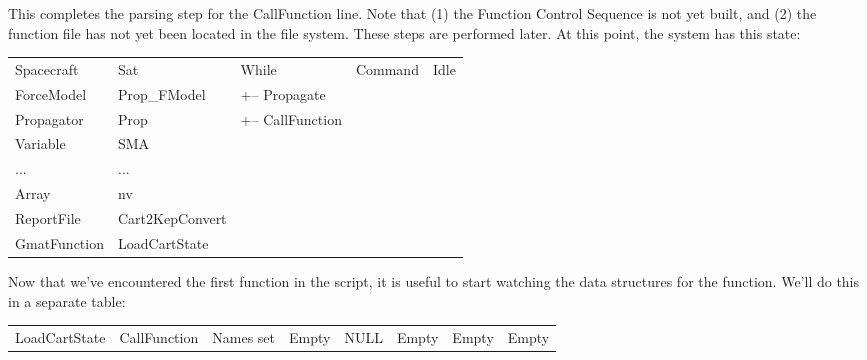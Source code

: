This completes the parsing step for the CallFunction line.  Note that (1) the Function Control
Sequence is not yet built, and (2) the function file has not yet been located in the file system. 
These steps are performed later.  At this point, the system has this state:

\begin{center}
\tablelasttail{\hline}
\begin{supertabular}{|l l|l|l|l|}
Spacecraft & Sat & While & Command & Idle\\
ForceModel & Prop\_FModel & +-- Propagate & & \\
Propagator & Prop & +-- CallFunction & & \\
Variable & SMA & & & \\
... & ... & & & \\
Array & nv & & & \\
ReportFile & Cart2KepConvert & & & \\
GmatFunction & LoadCartState & & & \\
\end{supertabular}
\end{center}

\noindent Now that we've encountered the first function in the script, it is useful to start
watching the data structures for the function.  We'll do this in a separate table:

\begin{center}
\begin{small}
\tablelasttail{\hline}
\begin{supertabular}{|l|l|m{0.56in}|m{0.55in}|m{0.55in}|m{0.55in}|m{0.55in}|m{0.55in}|}
LoadCartState & CallFunction & Names set & Empty & NULL & Empty & Empty & Empty\\
\end{supertabular}
\end{small}
\end{center}

